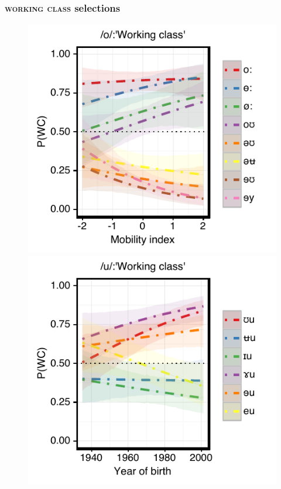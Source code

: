 \documentclass[PWPL]{article}
\begin{document}
\subsubsection{\textsc{working class} selections}
\begin{figure}[H]
\centering
\includegraphics[scale=0.8]{ow_class_dim3.pdf}
\includegraphics[scale=0.8]{uw_class_age.pdf}
\end{figure}
\end{document}
